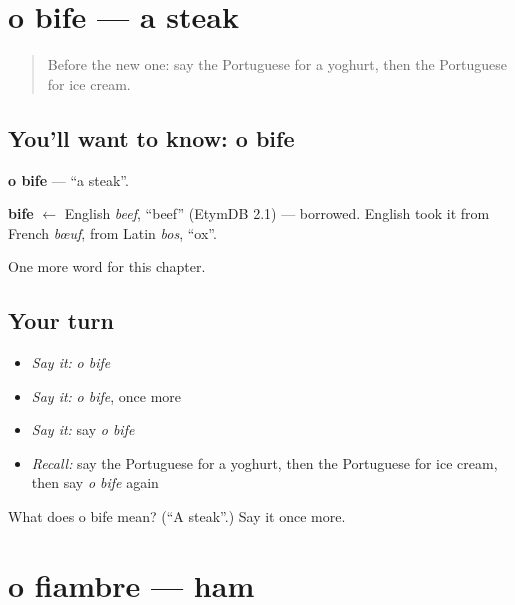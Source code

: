 \section[o bife]{o bife — a steak}

\label{lesson:PT-C108-bife}



\begin{quote}
Before the new one: say the Portuguese for a yoghurt, then the Portuguese for ice cream.
\end{quote}

\subsection*{You'll want to know: o bife}
\textbf{o bife} — \textquotedblleft{}a steak\textquotedblright{}.

\begin{cousinweb}
\textbf{bife} $\leftarrow$ English \emph{beef}, \textquotedblleft{}beef\textquotedblright{} (EtymDB 2.1) — borrowed. English took it from French \emph{bœuf}, from Latin \emph{bos}, \textquotedblleft{}ox\textquotedblright{}.
\end{cousinweb}

\begin{grammarlens}[title={What you've built}]
One more word for this chapter.
\end{grammarlens}

\subsection*{Your turn}
\begin{itemize}
\raggedright
  \item \emph{Say it:} \emph{o bife}
  \item \emph{Say it:} \emph{o bife}, once more
  \item \emph{Say it:} say \emph{o bife}
  \item \emph{Recall:} say the Portuguese for a yoghurt, then the Portuguese for ice cream, then say \emph{o bife} again
\end{itemize}

\begin{tcolorbox}[breakable,colback=teal!4,colframe=teal!35!black,title={Before you move on}]
What does o bife mean? (\textquotedblleft{}A steak\textquotedblright{}.) Say it once more.
\end{tcolorbox}
\section[o fiambre]{o fiambre — ham}


